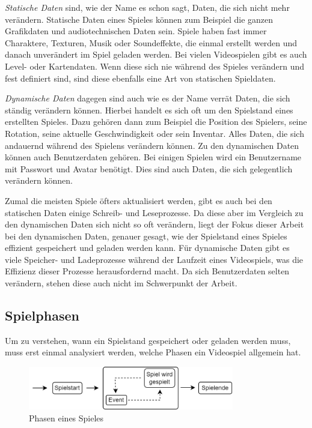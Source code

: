 \textit{Statische Daten} sind, wie der Name es schon sagt, Daten, die sich nicht mehr verändern. Statische Daten eines Spieles können zum Beispiel die ganzen Grafikdaten und audiotechnischen Daten sein. Spiele haben fast immer Charaktere, Texturen, Musik oder Soundeffekte, die einmal erstellt werden und danach unverändert im Spiel geladen werden. Bei vielen Videospielen gibt es auch Level- oder Kartendaten. Wenn diese sich nie während des Spieles verändern und fest definiert sind, sind diese ebenfalls eine Art von statischen Spieldaten. 

\textit{Dynamische Daten} dagegen sind auch wie es der Name verrät Daten, die sich ständig verändern können. Hierbei handelt es sich oft um den Spielstand eines erstellten Spieles. Dazu gehören dann zum Beispiel die Position des Spielers, seine Rotation, seine aktuelle Geschwindigkeit oder sein Inventar. Alles Daten, die sich andauernd während des Spielens verändern können. Zu den dynamischen Daten können auch Benutzerdaten gehören. Bei einigen Spielen wird ein Benutzername mit Passwort und Avatar benötigt. Dies sind auch Daten, die sich gelegentlich verändern können.

Zumal die meisten Spiele öfters aktualisiert werden, gibt es auch bei den statischen Daten einige Schreib- und Leseprozesse.\cite{lin2017studying} Da diese aber im Vergleich zu den dynamischen Daten sich nicht so oft verändern, liegt der Fokus dieser Arbeit bei den dynamischen Daten, genauer gesagt, wie der Spielstand eines Spieles effizient gespeichert und geladen werden kann. Für dynamische Daten gibt es viele Speicher- und Ladeprozesse während der Laufzeit eines Videospiels, was die Effizienz dieser Prozesse herausfordernd macht. Da sich Benutzerdaten selten verändern, stehen diese auch nicht im Schwerpunkt der Arbeit. 


\subsection{Spielphasen} \label{ssect:spielphasen}
Um zu verstehen, wann ein Spielstand gespeichert oder geladen werden muss, muss erst einmal analysiert werden, welche Phasen ein Videospiel allgemein hat.

\begin{figure}[htp]
    \centering
    \includegraphics[width=0.8\textwidth]{images/Spielphasen.png}
    \caption{Phasen eines Spieles}
    \label{fig:spielphasen}
\end{figure}

